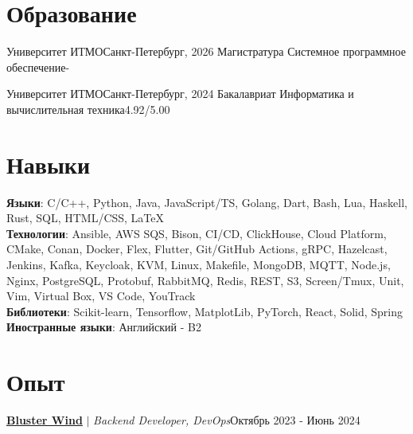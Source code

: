 \section{Образование}
  \resumeSubHeadingListStart
    \resumeSubheading
      {Университет ИТМО}{Санкт-Петербург, 2026}
      {Магистратура Системное программное обеспечение}{-}
  
    \resumeSubheading
      {Университет ИТМО}{Санкт-Петербург, 2024}
      {Бакалавриат Информатика и вычислительная техника}{4.92/5.00}
      
  \resumeSubHeadingListEnd

\section{Навыки}
 \begin{itemize}[leftmargin=0.15in, label={}]
    \small{\item{
    
     \textbf{Языки}{: C/C++, Python, Java, JavaScript/TS, Golang, Dart, Bash, Lua, Haskell, Rust, SQL, HTML/CSS, \LaTeX} \\
     
     \textbf{Технологии}{: Ansible, AWS SQS, Bison, CI/CD, ClickHouse, Cloud Platform, CMake, Conan, Docker, Flex, Flutter, Git/GitHub Actions, gRPC, Hazelcast, Jenkins, Kafka, Keycloak, KVM, Linux, Makefile, MongoDB, MQTT, Node.js, Nginx, PostgreSQL, Protobuf, RabbitMQ, Redis, REST, S3, Screen/Tmux, Unit, Vim, Virtual Box, VS Code, YouTrack} \\

     \textbf{Библиотеки}{: Scikit-learn, Tensorflow, MatplotLib, PyTorch, React, Solid, Spring} \\ 
     
     \textbf{Иностранные языки}{: Английский - B2}

    }}
 \end{itemize}


\section{Опыт}
  \resumeSubHeadingListStart

        \resumeExperienceHeading
          {{\underline{\textbf{Bluster Wind}}} $|$ \footnotesize\emph{Backend Developer, DevOps}}{Октябрь 2023 - Июнь 2024}
        \resumeItemListStart
        \resumeItemListEnd

